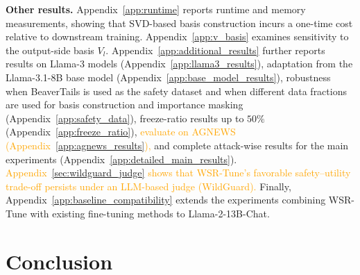 \documentclass{article}
\begin{document}
\textbf{Other results.} 
Appendix~\ref{app:runtime} reports runtime and memory measurements, showing that SVD-based basis construction incurs a one-time cost relative to downstream training. 
Appendix~\ref{app:v_basis} examines sensitivity to the output-side basis $V_l$. Appendix~\ref{app:additional_results} further reports results on Llama-3 models (Appendix~\ref{app:llama3_results}), adaptation from the Llama-3.1-8B base model (Appendix~\ref{app:base_model_results}), robustness when BeaverTails is used as the safety dataset and when different data fractions are used for basis construction and importance masking (Appendix~\ref{app:safety_data}), freeze-ratio results up to $50\%$ (Appendix~\ref{app:freeze_ratio}), \textcolor{orange}{evaluate on AGNEWS (Appendix~\ref{app:agnews_results}), } and complete attack-wise results for the main experiments (Appendix~\ref{app:detailed_main_results}). \textcolor{orange}{Appendix~\ref{sec:wildguard_judge} shows that WSR-Tune's favorable safety--utility trade-off persists under an LLM-based judge (WildGuard).}
Finally, Appendix~\ref{app:baseline_compatibility} extends the experiments combining WSR-Tune with existing fine-tuning methods to Llama-2-13B-Chat.








\vspace{-1mm}


\section{Conclusion} 
\vspace{-1mm}
\end{document}
